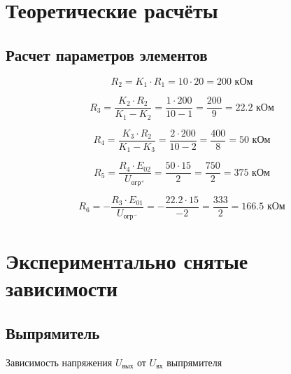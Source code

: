 \section{Теоретические расчёты}

\subsection{Расчет параметров элементов}

\begin{equation}
	\label{eq:4:1}
	R_2 = K_1 \cdot R_1 = 10 \cdot 20 = 200 \text{ кОм}
\end{equation}

\begin{equation}
	\label{eq:4:2}
	R_3 = \frac{K_2 \cdot R_2}{K_1 - K_2} = \frac{1 \cdot 200}{10 - 1} = \frac{200}{9} = 22.2 \text{ кОм}
\end{equation}

\begin{equation}
	\label{eq:4:3}
	R_4 = \frac{K_3 \cdot R_2}{K_1 - K_3} = \frac{2 \cdot 200}{10 - 2} = \frac{400}{8} = 50 \text{ кОм}
\end{equation}

\begin{equation}
	\label{eq:4:4}
	R_5 = \frac{R_4 \cdot E_{02}}{U_{\text{огр}^{+}}} = \frac{50 \cdot 15}{2} = \frac{750}{2} = 375 \text{ кОм}
\end{equation}


\begin{equation}
	\label{eq:4:5}
	R_6 = -\frac{R_3 \cdot E_{01}}{U_{\text{огр}^{-}}} = -\frac{22.2 \cdot 15}{-2} = \frac{333}{2} = 166.5 \text{ кОм}
\end{equation}

\section{Экспериментально снятые зависимости}

\subsection{Выпрямитель}

\begin{table}[H]
\begin{center}
	\caption{Зависимость напряжения $U_\text{вых}$ от $U_\text{вх}$ выпрямителя}
	\label{tab:rectifier}
	\def\tabcolsep{30pt}
	\fontsize{13}{14}\selectfont
\end{center}
\end{table}


